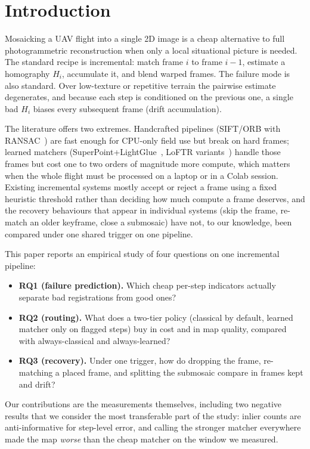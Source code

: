 \documentclass[conference]{IEEEtran}
\begin{document}
\section{Introduction}
Mosaicking a UAV flight into a single 2D image is a cheap alternative to
full photogrammetric reconstruction when only a local situational picture is
needed. The standard recipe is incremental: match frame $i$ to frame $i-1$,
estimate a homography $H_i$, accumulate it, and blend warped frames. The
failure mode is also standard. Over low-texture or repetitive terrain the
pairwise estimate degenerates, and because each step is conditioned on the
previous one, a single bad $H_i$ biases every subsequent frame
(drift accumulation).

The literature offers two extremes. Handcrafted pipelines
(SIFT/ORB with RANSAC~\cite{lowe2004,rublee2011,fischler1981}) are fast enough
for CPU-only field use but break on hard frames; learned matchers
(SuperPoint+LightGlue~\cite{detone2018,lindenberger2023}, LoFTR
variants~\cite{sun2021,wang2024}) handle those frames but cost one to two
orders of magnitude more compute, which matters when the whole flight must be
processed on a laptop or in a Colab session. Existing incremental systems
mostly accept or reject a frame using a fixed heuristic threshold
\cite{hwang2026,li2023} rather than deciding how much compute a frame deserves,
and the recovery behaviours that appear in individual systems (skip the frame,
re-match an older keyframe, close a submosaic) have not, to our knowledge,
been compared under one shared trigger on one pipeline.

This paper reports an empirical study of four questions on one incremental
pipeline:
\begin{itemize}
\item \textbf{RQ1 (failure prediction).} Which cheap per-step indicators
actually separate bad registrations from good ones?
\item \textbf{RQ2 (routing).} What does a two-tier policy (classical by
default, learned matcher only on flagged steps) buy in cost and in map
quality, compared with always-classical and always-learned?
\item \textbf{RQ3 (recovery).} Under one trigger, how do dropping the frame,
re-matching a placed frame, and splitting the submosaic compare in frames kept
and drift?
\end{itemize}
Our contributions are the measurements themselves, including two negative
results that we consider the most transferable part of the study: inlier
counts are anti-informative for step-level error, and calling the stronger
matcher everywhere made the map \emph{worse} than the cheap matcher on the
window we measured.
\end{document}
